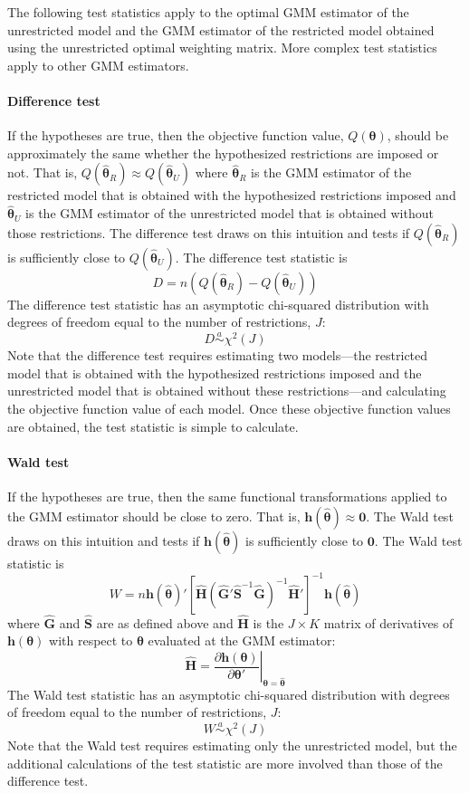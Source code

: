 \documentclass[11pt,letterpaper]{article}
\begin{document}
\noindent The following test statistics apply to the optimal GMM estimator of the unrestricted model and the GMM estimator of the restricted model obtained using the unrestricted optimal weighting matrix. More complex test statistics apply to other GMM estimators.

\paragraph{Difference test} If the hypotheses are true, then the objective function value, $Q(\bm{\theta})$, should be approximately the same whether the hypothesized restrictions are imposed or not. That is, $Q(\widehat{\bm{\theta}}_R) \approx Q(\widehat{\bm{\theta}}_U)$ where $\widehat{\bm{\theta}}_R$ is the GMM estimator of the restricted model that is obtained with the hypothesized restrictions imposed and $\widehat{\bm{\theta}}_U$ is the GMM estimator of the unrestricted model that is obtained without those restrictions. The difference test draws on this intuition and tests if $Q(\widehat{\bm{\theta}}_R)$ is sufficiently close to $Q(\widehat{\bm{\theta}}_U)$. The difference test statistic is
$$D = n \left( Q(\widehat{\bm{\theta}}_R) - Q(\widehat{\bm{\theta}}_U) \right)$$
The difference test statistic has an asymptotic chi-squared distribution with degrees of freedom equal to the number of restrictions, $J$:
$$D \overset{a}{\sim} \chi^2(J)$$
Note that the difference test requires estimating two models---the restricted model that is obtained with the hypothesized restrictions imposed and the unrestricted model that is obtained without these restrictions---and calculating the objective function value of each model. Once these objective function values are obtained, the test statistic is simple to calculate.

\paragraph{Wald test} If the hypotheses are true, then the same functional transformations applied to the GMM estimator should be close to zero. That is, $\bm{h}(\widehat{\bm{\theta}}) \approx \bm{0}$. The Wald test draws on this intuition and tests if $\bm{h}(\widehat{\bm{\theta}})$ is sufficiently close to $\bm{0}$. The Wald test statistic is
$$W = n \bm{h}(\widehat{\bm{\theta}})' \left[ \widehat{\bm{H}} \left( \widehat{\bm{G}}' \widehat{\bm{S}}^{-1} \widehat{\bm{G}} \right)^{-1} \widehat{\bm{H}}' \right]^{-1} \bm{h}(\widehat{\bm{\theta}})$$
where $\widehat{\bm{G}}$ and $\widehat{\bm{S}}$ are as defined above and $\widehat{\bm{H}}$ is the $J \times K$ matrix of derivatives of $\bm{h}(\bm{\theta})$ with respect to $\bm{\theta}$ evaluated at the GMM estimator:
$$\widehat{\bm{H}} = \left. \frac{\partial \bm{h}(\bm{\theta})}{\partial \bm{\theta}'} \right\vert_{\bm{\theta} = \widehat{\bm{\theta}}}$$
The Wald test statistic has an asymptotic chi-squared distribution with degrees of freedom equal to the number of restrictions, $J$:
$$W \overset{a}{\sim} \chi^2(J)$$
Note that the Wald test requires estimating only the unrestricted model, but the additional calculations of the test statistic are more involved than those of the difference test.
\end{document}
